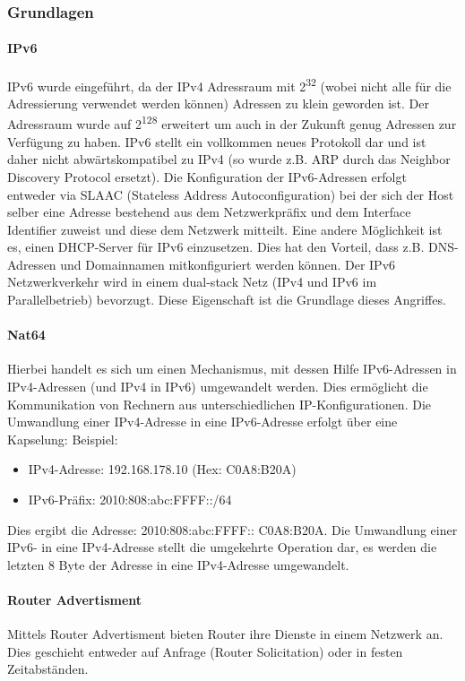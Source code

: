 \subsubsection*{Grundlagen}

\paragraph*{IPv6}
IPv6 wurde eingeführt, da der IPv4 Adressraum mit 2\textsuperscript{32} (wobei nicht alle für die Adressierung verwendet werden können) Adressen zu klein geworden ist. Der Adressraum wurde auf 2\textsuperscript{128} erweitert um auch in der Zukunft genug Adressen zur Verfügung zu haben. IPv6 stellt ein vollkommen neues Protokoll dar und ist daher nicht abwärtskompatibel zu IPv4 (so wurde z.B. ARP durch das Neighbor Discovery Protocol ersetzt). 
Die Konfiguration der IPv6-Adressen erfolgt entweder via SLAAC (Stateless Address Autoconfiguration) bei der sich der Host selber eine Adresse bestehend aus dem Netzwerkpräfix und dem Interface Identifier zuweist und diese dem Netzwerk mitteilt. Eine andere Möglichkeit ist es, einen DHCP-Server für IPv6 einzusetzen. Dies hat den Vorteil, dass z.B. DNS-Adressen und Domainnamen mitkonfiguriert werden können.
Der IPv6 Netzwerkverkehr wird in einem dual-stack Netz (IPv4 und IPv6 im Parallelbetrieb) bevorzugt. Diese Eigenschaft ist die Grundlage dieses Angriffes.

\paragraph*{Nat64}
Hierbei handelt es sich um einen Mechanismus, mit dessen Hilfe IPv6-Adressen in IPv4-Adressen (und IPv4 in IPv6) umgewandelt werden. Dies ermöglicht die Kommunikation von Rechnern aus unterschiedlichen IP-Konfigurationen. 
Die Umwandlung einer IPv4-Adresse in eine IPv6-Adresse erfolgt über eine Kapselung:
Beispiel:
\begin{itemize}
	\item IPv4-Adresse: 192.168.178.10 (Hex: C0A8:B20A)
	\item IPv6-Präfix: 2010:808:abc:FFFF::/64
\end{itemize}
Dies ergibt die Adresse: 2010:808:abc:FFFF:: C0A8:B20A. Die Umwandlung einer IPv6- in eine IPv4-Adresse stellt die umgekehrte Operation dar, es werden die letzten 8 Byte der Adresse in eine IPv4-Adresse umgewandelt.

\paragraph*{Router Advertisment}
Mittels Router Advertisment bieten Router ihre Dienste in einem Netzwerk an. Dies geschieht entweder auf Anfrage (Router Solicitation) oder in festen Zeitabständen.

